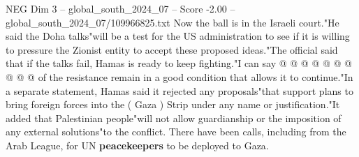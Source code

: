 \begin{textsample}{NEG Dim 3 – global\_south\_2024\_07 – Score -2.00 – global\_south\_2024\_07/109966825.txt}
Now the ball is in the Israeli court."He said the Doha talks"will be a test for the US administration to see if it is willing to pressure the Zionist entity to accept these proposed ideas."The official said that if the talks fail, Hamas is ready to keep fighting."I can say @ @ @ @ @ @ @ @ @ @ of the resistance remain in a good condition that allows it to continue."In a separate statement, Hamas said it rejected any proposals"that support plans to bring foreign forces into the ( Gaza ) Strip under any name or justification."It added that Palestinian people"will not allow guardianship or the imposition of any external solutions"to the conflict.
There have been calls, including from the Arab League, for UN \textbf{peacekeepers} to be deployed to Gaza.

\end{textsample}
